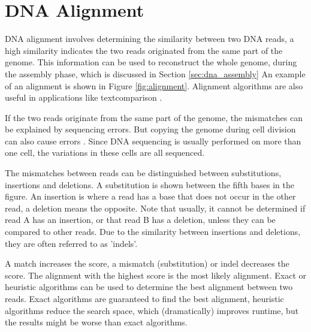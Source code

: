 \documentclass[../main/thesis.tex]{subfiles}
\begin{document}

\section{DNA Alignment}
DNA alignment involves determining the similarity between two DNA reads, a high similarity indicates the two reads originated from the same part of the genome.
This information can be used to reconstruct the whole genome, during the assembly phase, which is discussed in Section \ref{sec:dna_assembly}
An example of an alignment is shown in Figure \ref{fig:alignment}.
Alignment algorithms are also useful in applications like textcomparison \cite{SW_plagiarism}.


If the two reads originate from the same part of the genome, the mismatches can be explained by sequencing errors.
But copying the genome during cell division can also cause errors \cite{dna_replication_errors}.
Since DNA sequencing is usually performed on more than one cell, the variations in these cells are all sequenced.

The mismatches between reads can be distinguished between substitutions, insertions and deletions.
A substitution is shown between the fifth bases in the figure.
An insertion is where a read has a base that does not occur in the other read, a deletion means the opposite.
Note that usually, it cannot be determined if read A has an insertion, or that read B has a deletion, unless they can be compared to other reads.
Due to the similarity between insertions and deletions, they are often referred to as 'indels'.

A match increases the score, a mismatch (substitution) or indel decreases the score.
The alignment with the highest score is the most likely alignment.
Exact or heuristic algorithms can be used to determine the best alignment between two reads.
Exact algorithms are guaranteed to find the best alignment, heuristic algorithms reduce the search space, which (dramatically) improves runtime, but the results might be worse than exact algorithms.
\end{document}
